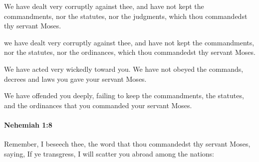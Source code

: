 			We have dealt very corruptly against thee, and have not kept the commandments, nor the statutes, nor the judgments, which thou commandedst thy servant Moses.

			\begin{versebox}
					\item[BHS] 
					\item[LXX] 
					\item[ASV] we have dealt very corruptly against thee, and have not kept the commandments, nor the statutes, nor the ordinances, which thou commandedst thy servant Moses.
					\item[NIV] We have acted very wickedly toward you. We have not obeyed the commands, decrees and laws you gave your servant Moses.
					\item[NRSV] We have offended you deeply, failing to keep the commandments, the statutes, and the ordinances that you commanded your servant Moses.
			\end{versebox}

		\paragraph{Nehemiah 1:8} %
			\label{NEHEMIAH-1-8}

			Remember, I beseech thee, the word that thou commandedst thy servant Moses, saying, If ye transgress, I will scatter you abroad among the nations:

